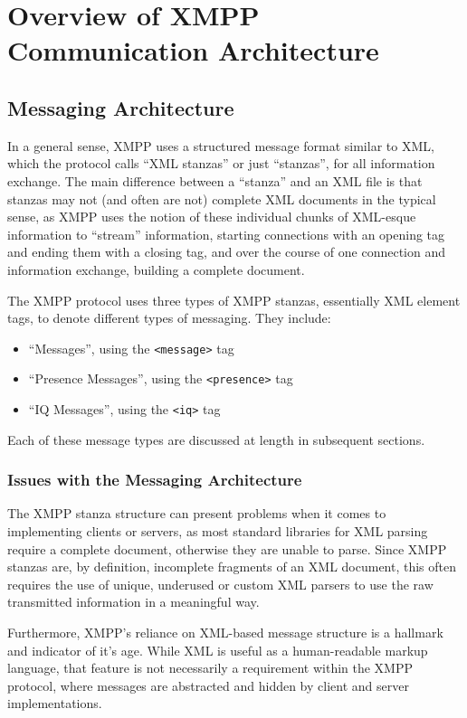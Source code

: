 \documentclass{article}
\begin{document}
\section{Overview of XMPP Communication Architecture}
\subsection{Messaging Architecture}
In a general sense, XMPP uses a structured message format similar to XML, which
the protocol calls ``XML stanzas'' or just ``stanzas'', for all information
exchange. The main difference between a ``stanza'' and an XML file is that
stanzas may not (and often are not) complete XML documents in the typical sense,
as XMPP uses the notion of these individual chunks of XML-esque information to
``stream'' information, starting connections with an opening tag and ending them
with a closing tag, and over the course of one connection and information
exchange, building a complete document. 

The XMPP protocol uses three types of XMPP stanzas, essentially XML element
tags, to denote different types of messaging. They include:

\begin{itemize}
    \item ``Messages'', using the \texttt{<message>} tag
    \item ``Presence Messages'', using the \texttt{<presence>} tag
    \item ``IQ Messages'', using the \texttt{<iq>} tag
\end{itemize}

Each of these message types are discussed at length in subsequent sections.

\subsubsection{Issues with the Messaging Architecture}
The XMPP stanza structure can present problems when it comes to implementing
clients or servers, as most standard libraries for XML parsing require a
complete document, otherwise they are unable to parse. Since XMPP stanzas are,
by definition, incomplete fragments of an XML document, this often requires the
use of unique, underused or custom XML parsers to use the raw transmitted
information in a meaningful way.

Furthermore, XMPP's reliance on XML-based message structure is a hallmark and
indicator of it's age. While XML is useful as a human-readable markup language,
that feature is not necessarily a requirement within the XMPP protocol, where
messages are abstracted and hidden by client and server implementations.  
\end{document}
